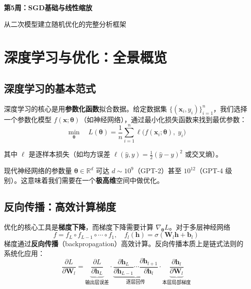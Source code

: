 \documentclass[12pt, a4paper]{ctexart}
\begin{document}
\begin{center}
{\LARGE\bfseries 第5周：SGD基础与线性缩放}

\vspace{0.5cm}
{\large 从二次模型建立随机优化的完整分析框架}
\end{center}

\tableofcontents
\newpage

\section{深度学习与优化：全景概览}

\subsection{深度学习的基本范式}

深度学习的核心是用\textbf{参数化函数}拟合数据。给定数据集 $\{(\bm{x}_i, y_i)\}_{i=1}^n$，我们选择一个参数化模型 $f(\bm{x}; \bm{\theta})$（如神经网络），通过最小化损失函数来找到最优参数：
\begin{equation}
    \min_{\bm{\theta}} \quad L(\bm{\theta}) = \frac{1}{n}\sum_{i=1}^n \ell\bigl(f(\bm{x}_i; \bm{\theta}),\; y_i\bigr)
\end{equation}

其中 $\ell$ 是逐样本损失（如均方误差 $\ell(\hat{y}, y) = \frac{1}{2}(\hat{y}-y)^2$ 或交叉熵）。

现代神经网络的参数量 $\bm{\theta} \in \mathbb{R}^d$ 可达 $d \sim 10^9$（GPT-2）甚至 $10^{12}$（GPT-4 级别）。这意味着我们需要在一个\textbf{极高维}空间中做优化。

\subsection{反向传播：高效计算梯度}

优化的核心工具是\textbf{梯度下降}，而梯度下降需要计算 $\nabla_{\bm{\theta}} L$。对于多层神经网络
\begin{equation}
    f = f_L \circ f_{L-1} \circ \cdots \circ f_1, \quad f_l(\bm{h}) = \sigma(\bm{W}_l \bm{h} + \bm{b}_l)
\end{equation}
梯度通过\textbf{反向传播}（backpropagation）高效计算。反向传播本质上是链式法则的系统化应用：
\begin{equation}
    \frac{\partial L}{\partial \bm{W}_l} = \underbrace{\frac{\partial L}{\partial \bm{h}_L}}_{\text{输出层误差}} \cdot \underbrace{\frac{\partial \bm{h}_L}{\partial \bm{h}_{L-1}} \cdots \frac{\partial \bm{h}_{l+1}}{\partial \bm{h}_l}}_{\text{逐层回传}} \cdot \underbrace{\frac{\partial \bm{h}_l}{\partial \bm{W}_l}}_{\text{本层局部梯度}}
\end{equation}
\end{document}
